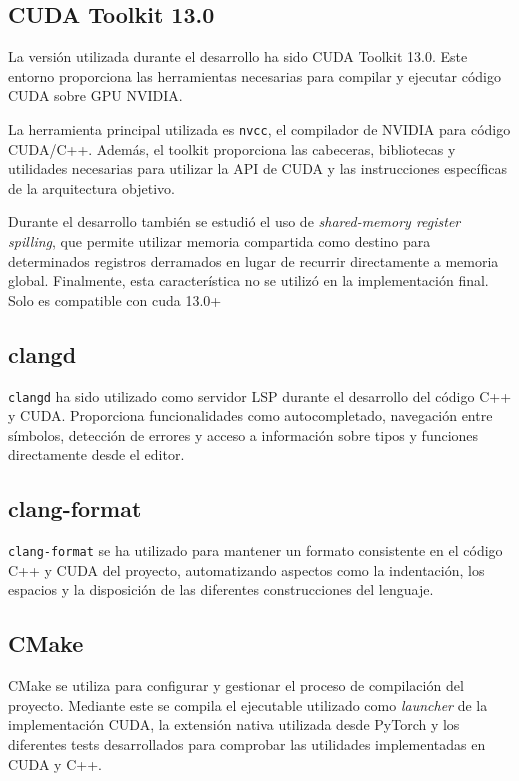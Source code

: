 \subsection{CUDA Toolkit 13.0}

La versión utilizada durante el desarrollo ha sido CUDA Toolkit 13.0. Este entorno proporciona las herramientas necesarias para compilar y ejecutar código CUDA sobre GPU NVIDIA.

La herramienta principal utilizada es \texttt{nvcc}, el compilador de NVIDIA para código CUDA/C++. Además, el toolkit proporciona las cabeceras, bibliotecas y utilidades necesarias para utilizar la API de CUDA y las instrucciones específicas de la arquitectura objetivo.

Durante el desarrollo también se estudió el uso de \textit{shared-memory register spilling}, que permite utilizar memoria compartida como destino para determinados registros derramados en lugar de recurrir directamente a memoria global. Finalmente, esta característica no se utilizó en la implementación final. Solo es compatible con cuda 13.0+

\subsection{clangd}

\texttt{clangd} ha sido utilizado como servidor LSP durante el desarrollo del código C++ y CUDA. Proporciona funcionalidades como autocompletado, navegación entre símbolos, detección de errores y acceso a información sobre tipos y funciones directamente desde el editor.

\subsection{clang-format}

\texttt{clang-format} se ha utilizado para mantener un formato consistente en el código C++ y CUDA del proyecto, automatizando aspectos como la indentación, los espacios y la disposición de las diferentes construcciones del lenguaje.

\subsection{CMake}

CMake se utiliza para configurar y gestionar el proceso de compilación del proyecto. Mediante este se compila el ejecutable utilizado como \textit{launcher} de la implementación CUDA, la extensión nativa utilizada desde PyTorch y los diferentes tests desarrollados para comprobar las utilidades implementadas en CUDA y C++.

